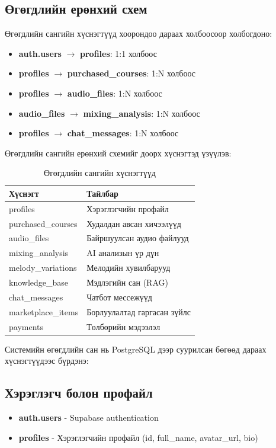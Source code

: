 \subsection{Өгөгдлийн ерөнхий схем}

Өгөгдлийн сангийн хүснэгтүүд хоорондоо дараах холбоосоор холбогдоно:
\begin{itemize}
    \item \textbf{auth.users} $\rightarrow$ \textbf{profiles}: 1:1 холбоос
    \item \textbf{profiles} $\rightarrow$ \textbf{purchased\_courses}: 1:N холбоос
    \item \textbf{profiles} $\rightarrow$ \textbf{audio\_files}: 1:N холбоос
    \item \textbf{audio\_files} $\rightarrow$ \textbf{mixing\_analysis}: 1:N холбоос
    \item \textbf{profiles} $\rightarrow$ \textbf{chat\_messages}: 1:N холбоос
\end{itemize}

Өгөгдлийн сангийн ерөнхий схемийг доорх хүснэгтэд үзүүлэв:

\begin{table}[htbp]
\centering
\caption{Өгөгдлийн сангийн хүснэгтүүд}
\label{tab:DatabaseTables}
\begin{tabular}{|l|p{10cm}|}
\hline
Хүснэгт & Тайлбар \\
\hline
profiles & Хэрэглэгчийн профайл \\
\hline
purchased\_courses & Худалдан авсан хичээлүүд \\
\hline
audio\_files & Байршуулсан аудио файлууд \\
\hline
mixing\_analysis & AI анализын үр дүн \\
\hline
melody\_variations & Мелодийн хувилбарууд \\
\hline
knowledge\_base & Мэдлэгийн сан (RAG) \\
\hline
chat\_messages & Чатбот мессежүүд \\
\hline
marketplace\_items & Борлуулалтад гаргасан зүйлс \\
\hline
payments & Төлбөрийн мэдээлэл \\
\hline
\end{tabular}
\end{table}

Системийн өгөгдлийн сан нь PostgreSQL дээр суурилсан бөгөөд дараах хүснэгтүүдээс бүрдэнэ:

\subsection{Хэрэглэгч болон профайл}
\begin{itemize}
    \item \textbf{auth.users} - Supabase authentication
    \item \textbf{profiles} - Хэрэглэгчийн профайл (id, full\_name, avatar\_url, bio)
\end{itemize}

